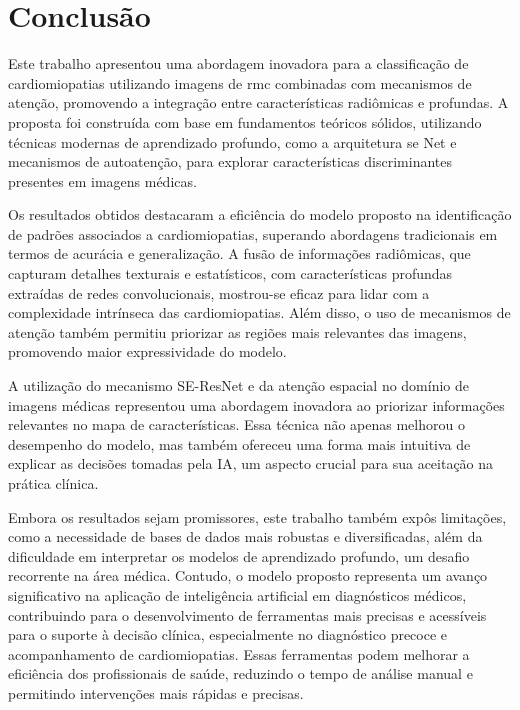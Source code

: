 \chapter{Conclusão}
\label{chap:conclusao}
\vspace{-\baselineskip} %

Este trabalho apresentou uma abordagem inovadora para a classificação de cardiomiopatias utilizando imagens de \gls{rmc} combinadas com mecanismos de atenção, promovendo a integração entre características radiômicas e profundas. A proposta foi construída com base em fundamentos teóricos sólidos, utilizando técnicas modernas de aprendizado profundo, como a arquitetura \gls{se} Net e mecanismos de autoatenção, para explorar características discriminantes presentes em imagens médicas.

Os resultados obtidos destacaram a eficiência do modelo proposto na identificação de padrões associados a cardiomiopatias, superando abordagens tradicionais em termos de acurácia e generalização. A fusão de informações radiômicas, que capturam detalhes texturais e estatísticos, com características profundas extraídas de redes convolucionais, mostrou-se eficaz para lidar com a complexidade intrínseca das cardiomiopatias. Além disso, o uso de mecanismos de atenção também permitiu priorizar as regiões mais relevantes das imagens, promovendo maior expressividade do modelo.

A utilização do mecanismo SE-ResNet e da atenção espacial no domínio de imagens médicas representou uma abordagem inovadora ao priorizar informações relevantes no mapa de características. Essa técnica não apenas melhorou o desempenho do modelo, mas também ofereceu uma forma mais intuitiva de explicar as decisões tomadas pela IA, um aspecto crucial para sua aceitação na prática clínica.

Embora os resultados sejam promissores, este trabalho também expôs limitações, como a necessidade de bases de dados mais robustas e diversificadas, além da dificuldade em interpretar os modelos de aprendizado profundo, um desafio recorrente na área médica. Contudo, o modelo proposto representa um avanço significativo na aplicação de inteligência artificial em diagnósticos médicos, contribuindo para o desenvolvimento de ferramentas mais precisas e acessíveis para o suporte à decisão clínica, especialmente no diagnóstico precoce e acompanhamento de cardiomiopatias. Essas ferramentas podem melhorar a eficiência dos profissionais de saúde, reduzindo o tempo de análise manual e permitindo intervenções mais rápidas e precisas.

